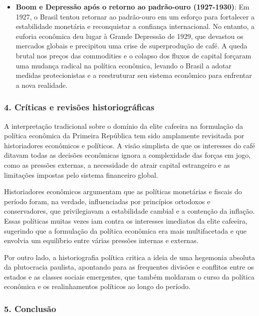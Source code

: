 \documentclass[a4paper,12pt]{article}[abntex2]
\begin{document}
\begin{itemize}
    \item \textbf{Boom e Depressão após o retorno ao padrão-ouro (1927-1930)}: Em 1927, o Brasil tentou retornar ao padrão-ouro em um esforço para fortalecer a estabilidade monetária e reconquistar a confiança internacional. No entanto, a euforia econômica deu lugar à Grande Depressão de 1929, que devastou os mercados globais e precipitou uma crise de superprodução de café. A queda brutal nos preços das commodities e o colapso dos fluxos de capital forçaram uma mudança radical na política econômica, levando o Brasil a adotar medidas protecionistas e a reestruturar seu sistema econômico para enfrentar a nova realidade.
\end{itemize}

\subsubsection{\textbf{4. Críticas e revisões historiográficas}}

A interpretação tradicional sobre o domínio da elite cafeeira na formulação da política econômica da Primeira República tem sido amplamente revisitada por historiadores econômicos e políticos. A visão simplista de que os interesses do café ditavam todas as decisões econômicas ignora a complexidade das forças em jogo, como as pressões externas, a necessidade de atrair capital estrangeiro e as limitações impostas pelo sistema financeiro global.

Historiadores econômicos argumentam que as políticas monetárias e fiscais do período foram, na verdade, influenciadas por princípios ortodoxos e conservadores, que privilegiavam a estabilidade cambial e a contenção da inflação. Essas políticas muitas vezes iam contra os interesses imediatos da elite cafeeira, sugerindo que a formulação da política econômica era mais multifacetada e que envolvia um equilíbrio entre várias pressões internas e externas.

Por outro lado, a historiografia política critica a ideia de uma hegemonia absoluta da plutocracia paulista, apontando para as frequentes divisões e conflitos entre os estados e as classes sociais emergentes, que também moldaram o curso da política econômica e os realinhamentos políticos ao longo do período.

\subsubsection{\textbf{5. Conclusão}}
\end{document}
